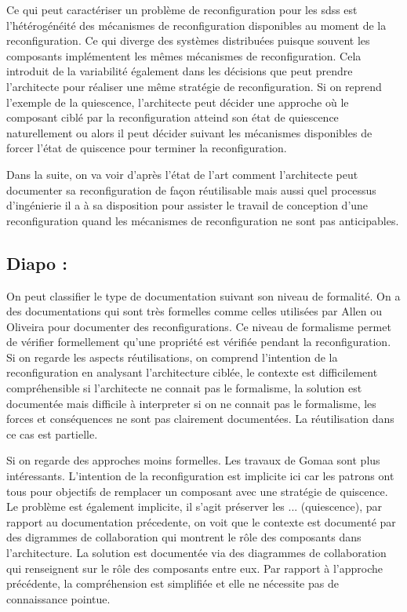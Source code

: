 Ce qui peut caractériser un problème de reconfiguration pour les sdss
est l'hétérogénéité des mécanismes de reconfiguration disponibles au
moment de la reconfiguration. Ce qui diverge des systèmes distribuées
puisque souvent les composants implémentent les mêmes mécanismes de
reconfiguration. Cela introduit de la variabilité également dans les
décisions que peut prendre l'architecte pour réaliser une même
stratégie de reconfiguration. Si on reprend l'exemple de la
quiescence, l'architecte peut décider une approche où le composant
ciblé par la reconfiguration atteind son état de quiescence
naturellement ou alors il peut décider suivant les mécanismes
disponibles de forcer l'état de quiscence pour terminer la
reconfiguration. 


Dans la suite, on va voir d'après l'état de
l'art comment l'architecte peut documenter sa reconfiguration de façon
réutilisable mais aussi quel processus d'ingénierie il a à sa
disposition pour assister le travail de conception d'une
reconfiguration quand les mécanismes de reconfiguration ne sont pas
anticipables.   

\subsection{Diapo : }
On peut classifier le type de documentation suivant son niveau de
formalité. On a des documentations qui sont très formelles comme
celles utilisées par Allen ou Oliveira pour documenter des
reconfigurations. Ce niveau de formalisme permet de vérifier
formellement qu'une propriété est vérifiée pendant la reconfiguration. 
Si on regarde les aspects réutilisations, on comprend l'intention de
la reconfiguration en analysant l'architecture ciblée, le contexte est
difficilement compréhensible si l'architecte ne connait pas le
formalisme, la solution est documentée mais difficile à interpreter si
on ne connait pas le formalisme, les forces et conséquences ne sont pas
clairement documentées. La réutilisation dans ce cas est partielle. 

Si on regarde des approches moins formelles. Les travaux de Gomaa sont
plus intéressants. L'intention de la reconfiguration est implicite ici
car les patrons ont tous pour objectifs de remplacer un composant avec
une stratégie de quiscence. Le problème est également implicite, il
s'agit préserver les ... (quiescence), par rapport au documentation
précedente, on voit que le contexte est documenté par des digrammes de
collaboration qui montrent le rôle des composants dans l'architecture. 
La solution est documentée via des diagrammes de collaboration qui
renseignent sur le rôle des composants entre eux. Par rapport à
l'approche précédente, la compréhension est simplifiée et elle ne
nécessite pas de connaissance pointue. 

